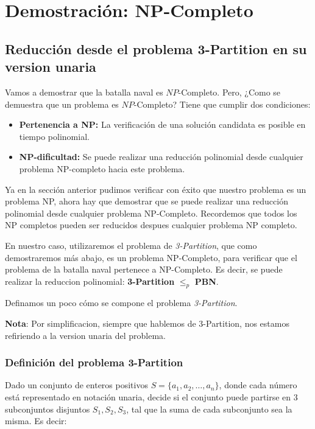 \section{Demostración: NP-Completo}


\subsection*{Reducción desde el problema 3-Partition en su version unaria}

Vamos a demostrar que la batalla naval es $NP$-Completo. Pero, ¿Como se demuestra que un problema es $NP$-Completo? Tiene que cumplir dos condiciones: 

\begin{itemize}
    \item \textbf{Pertenencia a NP:} La verificación de una solución candidata es posible en tiempo polinomial.
    \item \textbf{NP-dificultad:} Se puede realizar una reducción polinomial desde cualquier problema NP-completo hacia este problema.
\end{itemize}

Ya en la sección anterior pudimos verificar con éxito que nuestro problema es un problema NP, ahora hay que demostrar que se puede realizar una reducción polinomial desde cualquier problema NP-Completo. Recordemos que todos los NP completos pueden ser reducidos despues cualquier problema NP completo. 

En nuestro caso, utilizaremos el problema de \textit{3-Partition}, que como demostraremos más abajo, es un problema NP-Completo, para verificar que el problema de la batalla naval pertenece a NP-Completo. Es decir, se puede realizar la reduccion polinomial: \textbf{3-Partition} $\leq_p$ \textbf{PBN}.

Definamos un poco cómo se compone el problema \textit{3-Partition}.

\textbf{Nota}: Por simplificacion, siempre que hablemos de 3-Partition, nos estamos refiriendo a la version unaria del problema.

\subsubsection*{Definición del problema 3-Partition}

Dado un conjunto de enteros positivos \(S = \{a_1, a_2, \dots, a_{n}\}\), donde cada número está representado en notación unaria, decide si el conjunto puede partirse en 3 subconjuntos disjuntos \(S_1, S_2, S_3\), tal que la suma de cada subconjunto sea la misma. Es decir:

